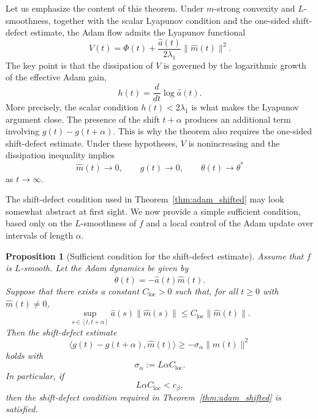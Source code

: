 \documentclass{article} %
\newtheorem{proposition}{Proposition}
\begin{document}
Let us emphasize the content of this theorem. Under \(m\)-strong convexity and \(L\)-smoothness, together with the scalar Lyapunov condition and the one-sided shift-defect estimate, the Adam flow admits the Lyapunov functional
\[
V(t)=\Phi(t)+\frac{\widehat a(t)}{2\lambda_1}\|\widehat m(t)\|^2.
\]
The key point is that the dissipation of \(V\) is governed by the logarithmic growth of the effective Adam gain,
\[
h(t)=\frac{d}{dt}\log \widehat a(t).
\]
More precisely, the scalar condition \(h(t)<2\lambda_1\) is what makes the Lyapunov argument close. The presence of the shift \(t+\alpha\) produces an additional term involving \(g(t)-g(t+\alpha)\). This is why the theorem also requires the one-sided shift-defect estimate. Under these hypotheses, \(V\) is nonincreasing and the dissipation inequality implies
\[
\widehat m(t)\to0,\qquad g(t)\to0,\qquad \theta(t)\to\theta^*
\]
as \(t\to\infty\).

The shift-defect condition used in Theorem~\ref{thm:adam_shifted} may look somewhat abstract at first sight. We now provide a simple sufficient condition, based only on the \(L\)-smoothness of \(f\) and a local control of the Adam update over intervals of length \(\alpha\).

\begin{proposition}[Sufficient condition for the shift-defect estimate]
Assume that \(f\) is \(L\)-smooth. Let the Adam dynamics be given by
\[
    \dot\theta(t)=-\widehat a(t)\widehat m(t).
\]
Suppose that there exists a constant \(C_{\mathrm{loc}}>0\) such that, for
all \(t\geq0\) with \(\widehat m(t)\neq0\),
\[
    \sup_{s\in[t,t+\alpha]}
    \widehat a(s)\|\widehat m(s)\|
    \leq
    C_{\mathrm{loc}}\|\widehat m(t)\|.
\]
Then the shift-defect estimate
\[
    \bigl\langle g(t)-g(t+\alpha),\widehat m(t)\bigr\rangle
    \geq
    -\sigma_\alpha\|\widehat m(t)\|^2
\]
holds with
\[
    \sigma_\alpha:=L\alpha C_{\mathrm{loc}}.
\]
In particular, if
\[
    L\alpha C_{\mathrm{loc}}<c_\beta,
\]
then the shift-defect condition required in Theorem~\ref{thm:adam_shifted} is satisfied.
\end{proposition}
\end{document}
